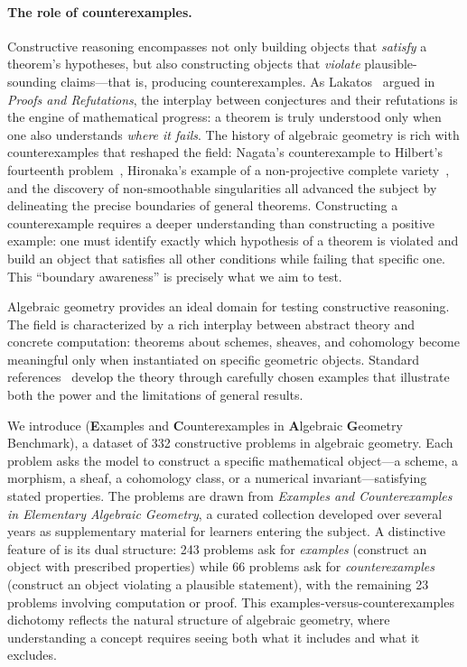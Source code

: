 \paragraph{The role of counterexamples.}
Constructive reasoning encompasses not only building objects that \emph{satisfy} a theorem's hypotheses, but also constructing objects that \emph{violate} plausible-sounding claims---that is, producing counterexamples.
As Lakatos~\citep{lakatos1976proofs} argued in \emph{Proofs and Refutations}, the interplay between conjectures and their refutations is the engine of mathematical progress: a theorem is truly understood only when one also understands \emph{where it fails}.
The history of algebraic geometry is rich with counterexamples that reshaped the field: Nagata's counterexample to Hilbert's fourteenth problem~\citep{nagata1959fourteenth}, Hironaka's example of a non-projective complete variety~\citep{hironaka1964resolution}, and the discovery of non-smoothable singularities all advanced the subject by delineating the precise boundaries of general theorems.
Constructing a counterexample requires a deeper understanding than constructing a positive example: one must identify exactly which hypothesis of a theorem is violated and build an object that satisfies all other conditions while failing that specific one.
This ``boundary awareness'' is precisely what we aim to test.

Algebraic geometry provides an ideal domain for testing constructive reasoning.
The field is characterized by a rich interplay between abstract theory and concrete computation: theorems about schemes, sheaves, and cohomology become meaningful only when instantiated on specific geometric objects.
Standard references~\citep{hartshorne1977algebraic, vakil2017rising, stacks-project, eisenbud1995commutative, griffiths1978principles} develop the theory through carefully chosen examples that illustrate both the power and the limitations of general results.

We introduce \ecagbench{} (\textbf{E}xamples and \textbf{C}ounterexamples in \textbf{A}lgebraic \textbf{G}eometry Benchmark), a dataset of 332 constructive problems in algebraic geometry.
Each problem asks the model to construct a specific mathematical object---a scheme, a morphism, a sheaf, a cohomology class, or a numerical invariant---satisfying stated properties.
The problems are drawn from \emph{Examples and Counterexamples in Elementary Algebraic Geometry}, a curated collection developed over several years as supplementary material for learners entering the subject.
A distinctive feature of \ecagbench{} is its dual structure: 243 problems ask for \emph{examples} (construct an object with prescribed properties) while 66 problems ask for \emph{counterexamples} (construct an object violating a plausible statement), with the remaining 23 problems involving computation or proof.
This examples-versus-counterexamples dichotomy reflects the natural structure of algebraic geometry, where understanding a concept requires seeing both what it includes and what it excludes.

